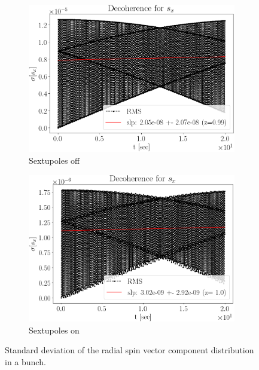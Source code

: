 \begin{figure}[h!]
	\centering
	\begin{subfigure}{\linewidth}
		\includegraphics[height=.35\paperheight]{images/decoh_sim/SX_decoh_20sec_unopt}
		\caption{Sextupoles off}
	\end{subfigure}
	\begin{subfigure}{\linewidth}
		\includegraphics[height=.35\paperheight]{images/decoh_sim/SX_decoh_20sec_opt}
		\caption{Sextupoles on}
	\end{subfigure}
	\caption{Standard deviation of the radial spin vector component distribution in a bunch.\label{fig:decoh:SX_SD}}
\end{figure}

